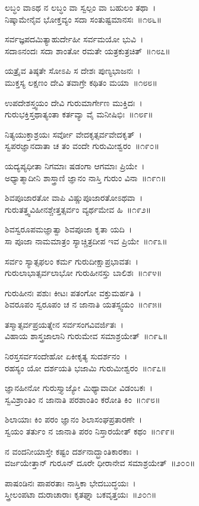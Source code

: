 ಲಬ್ಧಂ ವಾಽಥ ನ ಲಬ್ಧಂ ವಾ ಸ್ವಲ್ಪಂ ವಾ ಬಹುಲಂ ತಥಾ~।\\
ನಿಷ್ಕಾಮೇನೈವ ಭೋಕ್ತವ್ಯಂ ಸದಾ ಸಂತುಷ್ಟಮಾನಸಃ~॥೧೮೬॥

ಸರ್ವಜ್ಞಪದಮಿತ್ಯಾಹುರ್ದೇಹೀ ಸರ್ವಮಯೋ ಭುವಿ~।\\
ಸದಾಽನಂದಃ ಸದಾ ಶಾಂತೋ ರಮತೇ ಯತ್ರಕುತ್ರಚಿತ್~॥೧೮೭॥

ಯತ್ರೈವ ತಿಷ್ಠತೇ ಸೋಽಪಿ ಸ ದೇಶಃ ಪುಣ್ಯಭಾಜನಃ~।\\
ಮುಕ್ತಸ್ಯ ಲಕ್ಷಣಂ ದೇವಿ ತವಾಗ್ರೇ ಕಥಿತಂ ಮಯಾ~॥೧೮೮॥

ಉಪದೇಶಸ್ತ್ವಯಂ ದೇವಿ ಗುರುಮಾರ್ಗೇಣ ಮುಕ್ತಿದಃ~।\\
ಗುರುಭಕ್ತಿಸ್ತಥಾತ್ಯಂತಾ ಕರ್ತವ್ಯಾ ವೈ ಮನೀಷಿಭಿಃ~॥೧೮೯॥

ನಿತ್ಯಯುಕ್ತಾಶ್ರಯಃ ಸರ್ವೋ ವೇದಕೃತ್ಸರ್ವವೇದಕೃತ್~।\\
ಸ್ವಪರಜ್ಞಾನದಾತಾ ಚ ತಂ ವಂದೇ ಗುರುಮೀಶ್ವರಂ~॥೧೯೦॥

ಯದ್ಯಪ್ಯಧೀತಾ ನಿಗಮಾಃ ಷಡಂಗಾ ಆಗಮಾಃ ಪ್ರಿಯೇ~।\\
ಅಧ್ಯಾತ್ಮಾದೀನಿ ಶಾಸ್ತ್ರಾಣಿ ಜ್ಞಾನಂ ನಾಸ್ತಿ ಗುರುಂ ವಿನಾ~॥೧೯೧॥

ಶಿವಪೂಜಾರತೋ ವಾಪಿ ವಿಷ್ಣುಪೂಜಾರತೋಽಥವಾ~।\\
ಗುರುತತ್ತ್ವವಿಹೀನಶ್ಚೇತ್ತತ್ಸರ್ವಂ ವ್ಯರ್ಥಮೇವ ಹಿ~॥೧೯೨॥

ಶಿವಸ್ವರೂಪಮಜ್ಞಾತ್ವಾ ಶಿವಪೂಜಾ ಕೃತಾ ಯದಿ~।\\
ಸಾ ಪೂಜಾ ನಾಮಮಾತ್ರಂ ಸ್ಯಾಚ್ಚಿತ್ರದೀಪ ಇವ ಪ್ರಿಯೇ~॥೧೯೩॥

ಸರ್ವಂ ಸ್ಯಾತ್ಸಫಲಂ ಕರ್ಮ ಗುರುದೀಕ್ಷಾಪ್ರಭಾವತಃ~।\\
ಗುರುಲಾಭಾತ್ಸರ್ವಲಾಭೋ ಗುರುಹೀನಸ್ತು ಬಾಲಿಶಃ~॥೧೯೪॥

ಗುರುಹೀನಃ ಪಶುಃ ಕೀಟಃ ಪತಂಗೋ ವಕ್ತುಮರ್ಹತಿ~।\\
ಶಿವರೂಪಂ ಸ್ವರೂಪಂ ಚ ನ ಜಾನಾತಿ ಯತಸ್ಸ್ವಯಂ~॥೧೯೫॥

ತಸ್ಮಾತ್ಸರ್ವಪ್ರಯತ್ನೇನ ಸರ್ವಸಂಗವಿವರ್ಜಿತಃ~।\\
ವಿಹಾಯ ಶಾಸ್ತ್ರಜಾಲಾನಿ ಗುರುಮೇವ ಸಮಾಶ್ರಯೇತ್~॥೧೯೬॥

ನಿರಸ್ತಸರ್ವಸಂದೇಹೋ ಏಕೀಕೃತ್ಯ ಸುದರ್ಶನಂ~।\\
ರಹಸ್ಯಂ ಯೋ ದರ್ಶಯತಿ ಭಜಾಮಿ ಗುರುಮೀಶ್ವರಂ~॥೧೯೭॥

ಜ್ಞಾನಹೀನೋ ಗುರುಸ್ತ್ಯಾಜ್ಯೋ ಮಿಥ್ಯಾವಾದೀ ವಿಡಂಬಕಃ~।\\
ಸ್ವವಿಶ್ರಾಂತಿಂ ನ ಜಾನಾತಿ ಪರಶಾಂತಿಂ ಕರೋತಿ ಕಿಂ~॥೧೯೮॥

ಶಿಲಾಯಾಃ ಕಿಂ ಪರಂ ಜ್ಞಾನಂ ಶಿಲಾಸಂಘಪ್ರತಾರಣೇ~।\\
ಸ್ವಯಂ ತರ್ತುಂ ನ ಜಾನಾತಿ ಪರಂ ನಿಸ್ತಾರಯೇತ್ ಕಥಂ~॥೧೯೯॥

ನ ವಂದನೀಯಾಸ್ತೇ ಕಷ್ಟಂ ದರ್ಶನಾದ್ಭ್ರಾಂತಿಕಾರಕಾಃ~।\\
ವರ್ಜಯೇತ್ತಾನ್ ಗುರೂನ್ ದೂರೇ ಧೀರಾನೇವ ಸಮಾಶ್ರಯೇತ್~॥೨೦೦॥

ಪಾಷಂಡಿನಃ ಪಾಪರತಾಃ ನಾಸ್ತಿಕಾ ಭೇದಬುದ್ಧಯಃ~।\\
ಸ್ತ್ರೀಲಂಪಟಾ ದುರಾಚಾರಾಃ ಕೃತಘ್ನಾ ಬಕವೃತ್ತಯಃ~॥೨೦೧॥

